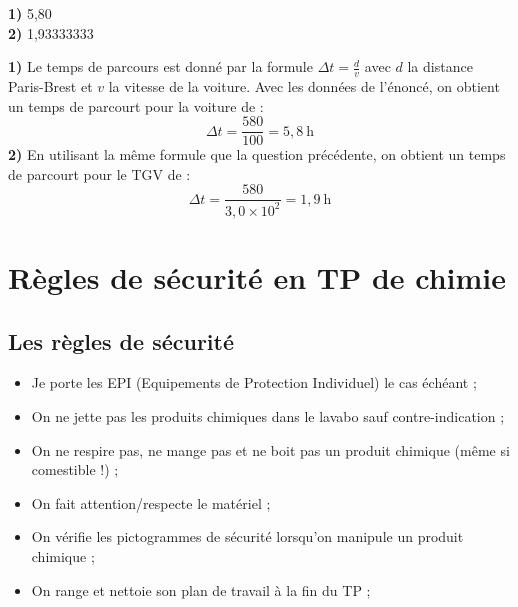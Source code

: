 \begin{minipage}{0.5\textwidth}
    \begin{tcolorbox}[colback=red!5!white,colframe=red!75!black,title=\textbf{Mauvaise rédaction : }]
    \textbf{1)} 5,80 \\
    \textbf{2)} 1,93333333\\
    \end{tcolorbox}
\end{minipage}
\begin{minipage}{0.5\textwidth}
    \begin{tcolorbox}[colback=green!5!white,colframe=green!75!black,title=\textbf{Bonne rédaction : }]
    \textbf{1)} Le temps de parcours est donné par la formule $\Delta t=\frac{d}{v}$ avec $d$ la distance Paris-Brest et $v$ la vitesse de la voiture. Avec les données de l'énoncé, on obtient un temps de parcourt pour la voiture de :
    \begin{equation*}
        \Delta t = \frac{580}{100} = 5,8~\text{h}
    \end{equation*}
    \textbf{2)} En utilisant la même formule que la question précédente, on obtient un temps de parcourt pour le TGV de :
     \begin{equation*}
        \Delta t = \frac{580}{3,0\times 10^2} = 1,9~\text{h}
    \end{equation*}
    \end{tcolorbox}
\end{minipage}


\section{Règles de sécurité en TP de chimie}
\subsection{Les règles de sécurité}
\begin{tcolorbox}[colback=red!5!white,colframe=red!75!black,title=\textbf{En TP de chimie :}]
\begin{itemize}
    \item Je porte les EPI (Equipements de Protection Individuel) le cas échéant ;
    \item On ne jette pas les produits chimiques dans le lavabo sauf contre-indication ;
    \item On ne respire pas, ne mange pas et ne boit pas un produit chimique (même si comestible !) ;
    \item On fait attention/respecte le matériel ;
    \item On vérifie les pictogrammes de sécurité lorsqu'on manipule un produit chimique ;
    \item On range et nettoie son plan de travail à la fin du TP ;
\end{itemize}
\end{tcolorbox}


